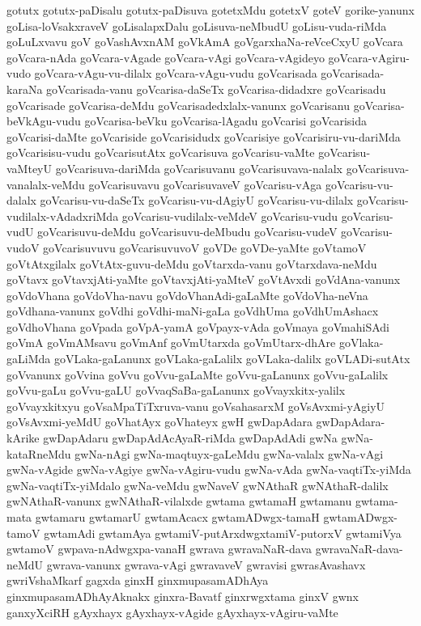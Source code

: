 {gotutx
gotutx-paDisalu
gotutx-paDisuva
gotetxMdu
gotetxV
goteV
gorike-yanunx
goLisa-loVsakxraveV
goLisalapxDalu
goLisuva-neMbudU
goLisu-vuda-riMda
goLuLxvavu
goV
goVashAvxnAM
goVkAmA
goVgarxhaNa-reVceCxyU
goVcara
goVcara-nAda
goVcara-vAgade
goVcara-vAgi
goVcara-vAgideyo
goVcara-vAgiru-vudo
goVcara-vAgu-vu-dilalx
goVcara-vAgu-vudu
goVcarisada
goVcarisada-karaNa
goVcarisada-vanu
goVcarisa-daSeTx
goVcarisa-didadxre
goVcarisadu
goVcarisade
goVcarisa-deMdu
goVcarisadedxlalx-vanunx
goVcarisanu
goVcarisa-beVkAgu-vudu
goVcarisa-beVku
goVcarisa-lAgadu
goVcarisi
goVcarisida
goVcarisi-daMte
goVcariside
goVcarisidudx
goVcarisiye
goVcarisiru-vu-dariMda
goVcarisisu-vudu
goVcarisutAtx
goVcarisuva
goVcarisu-vaMte
goVcarisu-vaMteyU
goVcarisuva-dariMda
goVcarisuvanu
goVcarisuvava-nalalx
goVcarisuva-vanalalx-veMdu
goVcarisuvavu
goVcarisuvaveV
goVcarisu-vAga
goVcarisu-vu-dalalx
goVcarisu-vu-daSeTx
goVcarisu-vu-dAgiyU
goVcarisu-vu-dilalx
goVcarisu-vudilalx-vAdadxriMda
goVcarisu-vudilalx-veMdeV
goVcarisu-vudu
goVcarisu-vudU
goVcarisuvu-deMdu
goVcarisuvu-deMbudu
goVcarisu-vudeV
goVcarisu-vudoV
goVcarisuvuvu
goVcarisuvuvoV
goVDe
goVDe-yaMte
goVtamoV
goVtAtxgilalx
goVtAtx-guvu-deMdu
goVtarxda-vanu
goVtarxdava-neMdu
goVtavx
goVtavxjAti-yaMte
goVtavxjAti-yaMteV
goVtAvxdi
goVdAna-vanunx
goVdoVhana
goVdoVha-navu
goVdoVhanAdi-gaLaMte
goVdoVha-neVna
goVdhana-vanunx
goVdhi
goVdhi-maNi-gaLa
goVdhUma
goVdhUmAshacx
goVdhoVhana
goVpada
goVpA-yamA
goVpayx-vAda
goVmaya
goVmahiSAdi
goVmA
goVmAMsavu
goVmAnf
goVmUtarxda
goVmUtarx-dhAre
goVlaka-gaLiMda
goVLaka-gaLanunx
goVLaka-gaLalilx
goVLaka-dalilx
goVLADi-sutAtx
goVvanunx
goVvina
goVvu
goVvu-gaLaMte
goVvu-gaLanunx
goVvu-gaLalilx
goVvu-gaLu
goVvu-gaLU
goVvaqSaBa-gaLanunx
goVvayxkitx-yalilx
goVvayxkitxyu
goVsaMpaTiTxruva-vanu
goVsahasarxM
goVsAvxmi-yAgiyU
goVsAvxmi-yeMdU
goVhatAyx
goVhateyx
gwH
gwDapAdara
gwDapAdara-kArike
gwDapAdaru
gwDapAdAcAyaR-riMda
gwDapAdAdi
gwNa
gwNa-kataRneMdu
gwNa-nAgi
gwNa-maqtuyx-gaLeMdu
gwNa-valalx
gwNa-vAgi
gwNa-vAgide
gwNa-vAgiye
gwNa-vAgiru-vudu
gwNa-vAda
gwNa-vaqtiTx-yiMda
gwNa-vaqtiTx-yiMdalo
gwNa-veMdu
gwNaveV
gwNAthaR
gwNAthaR-dalilx
gwNAthaR-vanunx
gwNAthaR-vilalxde
gwtama
gwtamaH
gwtamanu
gwtama-mata
gwtamaru
gwtamarU
gwtamAcacx
gwtamADwgx-tamaH
gwtamADwgx-tamoV
gwtamAdi
gwtamAya
gwtamiV-putArxdwgxtamiV-putorxV
gwtamiVya
gwtamoV
gwpava-nAdwgxpa-vanaH
gwrava
gwravaNaR-dava
gwravaNaR-dava-neMdU
gwrava-vanunx
gwrava-vAgi
gwravaveV
gwravisi
gwrasAvashavx
gwriVshaMkarf
gagxda
ginxH
ginxmupasamADhAya
ginxmupasamADhAyAknakx
ginxra-Bavatf
ginxrwgxtama
ginxV
gwnx
ganxyXciRH
gAyxhayx
gAyxhayx-vAgide
gAyxhayx-vAgiru-vaMte
}
